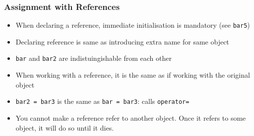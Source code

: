 \begin{frame}
  \frametitle{Assignment with References}
  \begin{itemize}
    \item When declaring a reference, immediate initialisation is mandatory (see {\tt bar5})
    \item Declaring reference is same as introducing extra name for same object
    \item {\tt bar} and {\tt bar2} are indistuingishable from each other
    \item When working with a reference, it is the same as if working with the original object
    \item {\tt bar2 = bar3} is the same as {\tt bar = bar3}: calls {\tt operator=}
    \item You cannot make a reference refer to another object. Once it refers to some object,
          it will do so until it dies.
  \end{itemize}
\end{frame}



